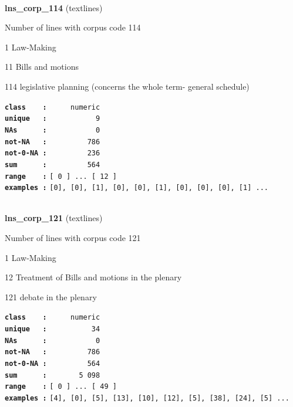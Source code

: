 \documentclass[]{article}
\begin{document}
~

\textbf{lns\_corp\_114} (textlines)

Number of lines with corpus code 114

1 Law-Making

11 Bills and motions

114 legislative planning (concerns the whole term- general schedule)

\textbf{\texttt{class\ \ \ \ :}} \texttt{~~~~~numeric}\\
\textbf{\texttt{unique\ \ \ :}} \texttt{~~~~~~~~~~~9}\\
\textbf{\texttt{NAs\ \ \ \ \ \ :}} \texttt{~~~~~~~~~~~0}\\
\textbf{\texttt{not-NA\ \ \ :}} \texttt{~~~~~~~~~786}\\
\textbf{\texttt{not-0-NA\ :}} \texttt{~~~~~~~~~236}\\
\textbf{\texttt{sum\ \ \ \ \ \ :}} \texttt{~~~~~~~~~564}\\
\textbf{\texttt{range\ \ \ \ :}}
\texttt{{[}\ 0\ {]}\ ...\ {[}\ 12\ {]}}\\
\textbf{\texttt{examples\ :}}
\texttt{{[}0{]},\ {[}0{]},\ {[}1{]},\ {[}0{]},\ {[}0{]},\ {[}1{]},\ {[}0{]},\ {[}0{]},\ {[}0{]},\ {[}1{]}\ ...}\\

~

\textbf{lns\_corp\_121} (textlines)

Number of lines with corpus code 121

1 Law-Making

12 Treatment of Bills and motions in the plenary

121 debate in the plenary

\textbf{\texttt{class\ \ \ \ :}} \texttt{~~~~~numeric}\\
\textbf{\texttt{unique\ \ \ :}} \texttt{~~~~~~~~~~34}\\
\textbf{\texttt{NAs\ \ \ \ \ \ :}} \texttt{~~~~~~~~~~~0}\\
\textbf{\texttt{not-NA\ \ \ :}} \texttt{~~~~~~~~~786}\\
\textbf{\texttt{not-0-NA\ :}} \texttt{~~~~~~~~~564}\\
\textbf{\texttt{sum\ \ \ \ \ \ :}} \texttt{~~~~~~~5~098}\\
\textbf{\texttt{range\ \ \ \ :}}
\texttt{{[}\ 0\ {]}\ ...\ {[}\ 49\ {]}}\\
\textbf{\texttt{examples\ :}}
\texttt{{[}4{]},\ {[}0{]},\ {[}5{]},\ {[}13{]},\ {[}10{]},\ {[}12{]},\ {[}5{]},\ {[}38{]},\ {[}24{]},\ {[}5{]}\ ...}\\
\end{document}
